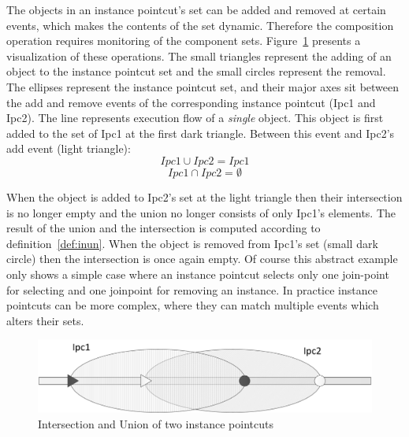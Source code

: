 \documentclass{acm_proc_article-sp}
\begin{document}
The objects in an instance pointcut's set can be added and removed at certain events, which makes the contents of the set dynamic. Therefore the composition operation requires monitoring of the component sets.  Figure~\ref{fig:interunionvis} presents a visualization of these operations. The small triangles represent the adding of an object to the instance pointcut set and the small circles represent the removal. The ellipses represent the instance pointcut set, and their major axes sit between the add and remove events of the corresponding instance pointcut (Ipc1 and Ipc2). The line represents execution flow of a \emph{single} object. This object is first added to the set of Ipc1 at the first dark triangle. Between this event and Ipc2's add event (light triangle):
\[Ipc1 \cup  Ipc2 = Ipc1\]
\[Ipc1 \cap Ipc2 = \emptyset\]

When the object is added to Ipc2's set at the light triangle then their intersection is no longer empty and the union no longer consists of only Ipc1's elements. The result of the union and the intersection is computed according to definition~\ref{def:inun}. When the object is removed from Ipc1's set (small dark circle) then the intersection is once again empty. Of course this abstract example only shows a simple case where an instance pointcut selects only one join-point for selecting and one joinpoint for removing an instance. In practice instance pointcuts can be more complex, where they can match multiple events which alters their sets. 

\begin{figure}
	\centering
		\includegraphics[width=\columnwidth]{images/interunionvis.png}
	\caption{Intersection and Union of two instance pointcuts}
	\label{fig:interunionvis}
\end{figure}
\end{document}
